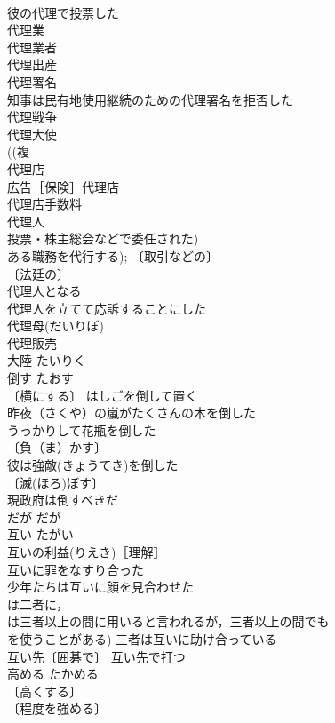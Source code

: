 \documentclass[8pt]{extreport}
\begin{document}
\begin{CJK}{UTF8}{min}
\\	彼の代理で投票した 
\\	代理業 
\\	代理業者 
\\	代理出産 
\\	代理署名 
\\	知事は民有地使用継続のための代理署名を拒否した 
\\	代理戦争 
\\	代理大使 
\\	((複
\\	代理店 
\\	広告［保険］代理店 
\\	代理店手数料 
\\	代理人 
\\	投票・株主総会などで委任された) 
\\	ある職務を代行する); 〔取引などの〕
\\	〔法廷の〕
\\	代理人となる 
\\	代理人を立てて応訴することにした 
\\	代理母(だいりぼ) 
\\	代理販売 
\\	大陸	たいりく	
\\	倒す	たおす	
\\	〔横にする〕 はしごを倒して置く 
\\	昨夜（さくや）の嵐がたくさんの木を倒した 
\\	うっかりして花瓶を倒した 
\\	〔負（ま）かす〕
\\	彼は強敵(きょうてき)を倒した 
\\	〔滅(ほろ)ぼす〕
\\	現政府は倒すべきだ 
\\	だが	だが	
\\	互い	たがい	
\\	互いの利益(りえき)［理解］ 
\\	互いに罪をなすり合った 
\\	少年たちは互いに顔を見合わせた 
\\	は二者に，
\\	は三者以上の間に用いると言われるが，三者以上の間でも
\\	を使うことがある) 三者は互いに助け合っている 
\\	互い先〔囲碁で〕 互い先で打つ 
\\	高める	たかめる	
\\	〔高くする〕
\\	〔程度を強める〕

\end{CJK}
\end{document}
